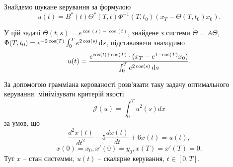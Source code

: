 \begin{solution}
	Знайдемо шукане керування за формулою \[ u(t) = B^*(t) \Theta^*(T, t) \Phi^{-1}(T, t_0) (x_T - \Theta(T, t_0) x_0). \]

	У цій задачі $\Theta(t, s) = e^{\cos (s) - \cos (t)}$, знайдене з системи $\dot \Theta = A \Theta$, $\Phi(T, t_0) = e^{-2 \cos (T)} \int_0^T e^{2 \cos (s)} \mathop{}\!\mathrm{d} s$, підставляючи знаходимо \[ u(t) = \frac{e^{\cos (t) + \cos (T)} \cdot (x_T - e^{1 - \cos (T)} x_0)}{\int_0^T e^{2 \cos (s)} \mathop{}\!\mathrm{d} s}. \]
\end{solution}

\begin{problem}
    За допомогою грамміана керованості розв'язати таку задачу оптимального керування: мінімізувати критерій якості
    \[ \mathcal{J}(u) = \int_0^T u^2(s) dx \]
    за умов, що
    \[ \dfrac{d^2x(t)}{dt^2} - 5\dfrac{dx(t)}{dt} + 6x(t) = u(t), \]
    \[ x(0) = x_0, x'(0) = y_0, x(T) = x'(T) = 0.\]
    Тут $x$ -- стан системми, $u(t)$ -- скалярне керування, $t \in [0, T]$.
\end{problem}

